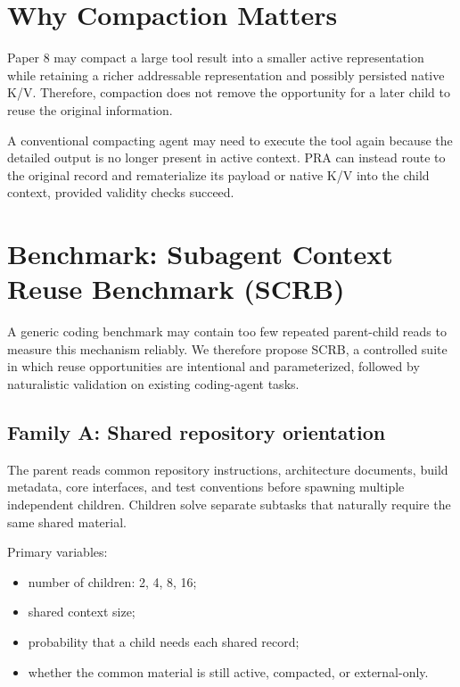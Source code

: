\documentclass[11pt]{article}
\begin{document}
\section{Why Compaction Matters}

Paper 8 may compact a large tool result into a smaller active representation while retaining a richer addressable representation and possibly persisted native K/V. Therefore, compaction does not remove the opportunity for a later child to reuse the original information.

A conventional compacting agent may need to execute the tool again because the detailed output is no longer present in active context. PRA can instead route to the original record and rematerialize its payload or native K/V into the child context, provided validity checks succeed.

\section{Benchmark: Subagent Context Reuse Benchmark (SCRB)}

A generic coding benchmark may contain too few repeated parent-child reads to measure this mechanism reliably. We therefore propose SCRB, a controlled suite in which reuse opportunities are intentional and parameterized, followed by naturalistic validation on existing coding-agent tasks.

\subsection{Family A: Shared repository orientation}

The parent reads common repository instructions, architecture documents, build metadata, core interfaces, and test conventions before spawning multiple independent children. Children solve separate subtasks that naturally require the same shared material.

Primary variables:

\begin{itemize}[leftmargin=*]
    \item number of children: 2, 4, 8, 16;
    \item shared context size;
    \item probability that a child needs each shared record;
    \item whether the common material is still active, compacted, or external-only.
\end{itemize}
\end{document}
